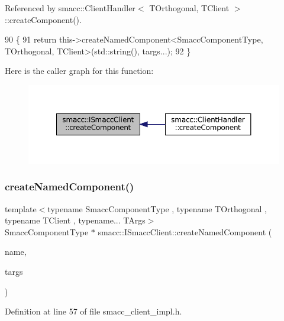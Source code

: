 Referenced by smacc\+::\+Client\+Handler$<$ T\+Orthogonal, T\+Client $>$\+::create\+Component().


\begin{DoxyCode}
90 \{
91     \textcolor{keywordflow}{return} this->createNamedComponent<SmaccComponentType, TOrthogonal, TClient>(std::string(), targs...);
92 \}
\end{DoxyCode}
Here is the caller graph for this function\+:
\nopagebreak
\begin{figure}[H]
\begin{center}
\leavevmode
\includegraphics[width=350pt]{classsmacc_1_1ISmaccClient_a5c1c8eb5e91a3b399662a52cb0ca86aa_icgraph}
\end{center}
\end{figure}
\mbox{\label{classsmacc_1_1ISmaccClient_affcc2f95bc993b5f07ef0d6ab6eec8f1}} 
\subsubsection{\texorpdfstring{create\+Named\+Component()}{createNamedComponent()}}
{\footnotesize\ttfamily template$<$typename Smacc\+Component\+Type , typename T\+Orthogonal , typename T\+Client , typename... T\+Args$>$ \\
Smacc\+Component\+Type $\ast$ smacc\+::\+I\+Smacc\+Client\+::create\+Named\+Component (\begin{DoxyParamCaption}\item[{std\+::string}]{name,  }\item[{T\+Args...}]{targs }\end{DoxyParamCaption})\hspace{0.3cm}{\ttfamily [protected]}}



Definition at line 57 of file smacc\+\_\+client\+\_\+impl.\+h.



